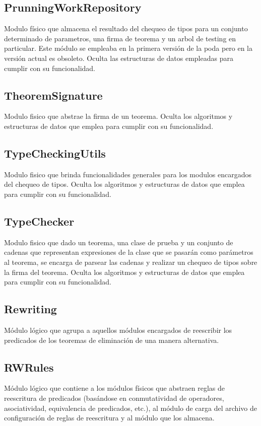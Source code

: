 \documentclass[a4paper,10pt]{report}
\begin{document}
			\subsection{PrunningWorkRepository}
			Modulo físico que almacena el resultado del chequeo de tipos para un conjunto determinado de parametros, una firma de teorema y un arbol de testing en particular.
			Este módulo se empleaba en la primera versión de la poda pero en la versión actual es obsoleto.
			Oculta las estructuras de datos empleadas para cumplir con su funcionalidad.
			\subsection{TheoremSignature}
			Modulo fisico que abstrae la firma de un teorema.
			Oculta los algoritmos y estructuras de datos que emplea para cumplir con su funcionalidad.
			\subsection{TypeCheckingUtils}
			Modulo fisico que brinda funcionalidades generales para los modulos encargados del chequeo de tipos.
			Oculta los algoritmos y estructuras de datos que emplea para cumplir con su funcionalidad.
			\subsection{TypeChecker}
			Modulo fisico que dado un teorema, una clase de prueba y un conjunto de cadenas que representan expresiones de la clase que se pasarán como parámetros al teorema, se encarga de parsear las cadenas y realizar un chequeo de tipos sobre la firma del teorema.
			Oculta los algoritmos y estructuras de datos que emplea para cumplir con su funcionalidad.
		\subsection{Rewriting}
		Módulo lógico que agrupa a aquellos módulos encargados de reescribir los predicados de los teoremas de eliminación de una manera alternativa.
			\subsection{RWRules}
			Módulo lógico que contiene a los módulos físicos que abstraen reglas de reescritura de predicados (basándose en conmutatividad de operadores, asociatividad, equivalencia de predicados, etc.), al módulo de carga del archivo de configuración de reglas de reescritura y al módulo que los almacena.
\end{document}
